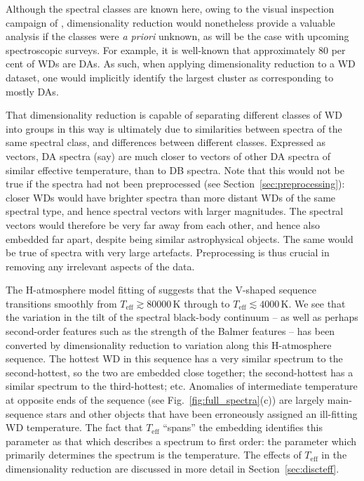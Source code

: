 \documentclass[fleqn,usenatbib]{mnras}
\def\Teff{T_\mathrm{eff}}
\begin{document}
Although the spectral classes are known here, owing to the visual inspection campaign of \citet{manser24}, dimensionality reduction would nonetheless provide a valuable analysis if the classes were \textit{a priori} unknown, as will be the case with upcoming spectroscopic surveys.
For example, it is well-known that approximately 80 per cent of WDs are DAs.
As such, when applying dimensionality reduction to a WD dataset, one would implicitly identify the largest cluster as corresponding to mostly DAs.

That dimensionality reduction is capable of separating different classes of WD into groups in this way is ultimately due to similarities between spectra of the same spectral class, and differences between different classes.
Expressed as vectors, DA spectra (say) are much closer to vectors of other DA spectra of similar effective temperature, than to DB spectra.
Note that this would not be true if the spectra had not been preprocessed (see Section~\ref{sec:preprocessing}): closer WDs would have brighter spectra than more distant WDs of the same spectral type, and hence spectral vectors with larger magnitudes.
The spectral vectors would therefore be very far away from each other, and hence also embedded far apart, despite being similar astrophysical objects.
The same would be true of spectra with very large artefacts.
Preprocessing is thus crucial in removing any irrelevant aspects of the data.

The H-atmosphere model fitting of \citet{gentilefusillo19} suggests that the V-shaped sequence transitions smoothly from $\Teff \gtrsim 80000\,\text{K}$ through to $\Teff \lesssim 4000\,\text{K}$.
We see that the variation in the tilt of the spectral black-body continuum -- as well as perhaps second-order features such as the strength of the Balmer features -- has been converted by dimensionality reduction to variation along this H-atmosphere sequence.
The hottest WD in this sequence has a very similar spectrum to the second-hottest, so the two are embedded close together; the second-hottest has a similar spectrum to the third-hottest; etc.
Anomalies of intermediate temperature at opposite ends of the sequence (see Fig.~\ref{fig:full_spectra}(c)) are largely main-sequence stars and other objects that have been erroneously assigned an ill-fitting WD temperature.
The fact that $\Teff$ ``spans'' the embedding identifies this parameter as that which describes a spectrum to first order: the parameter which primarily determines the spectrum is the temperature.
The effects of $\Teff$ in the dimensionality reduction are discussed in more detail in Section~\ref{sec:discteff}.
\end{document}
